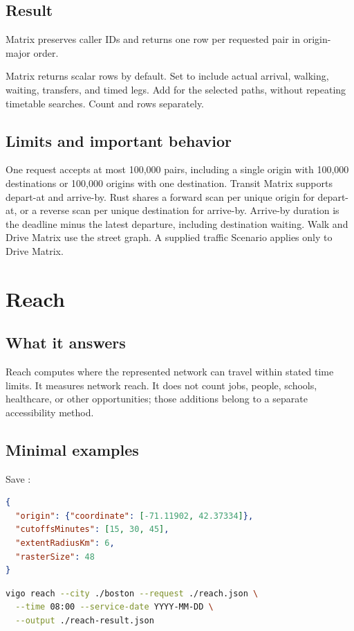 \documentclass[10pt,letterpaper]{article}
\begin{document}
\subsection{Result}

Matrix preserves caller IDs and returns one row per requested pair in origin-major order.

Matrix returns scalar rows by default. Set  to include actual arrival, walking, waiting, transfers, and timed legs. Add  for the selected paths, without repeating timetable searches. Count  and  rows separately.

\subsection{Limits and important behavior}

One request accepts at most 100,000 pairs, including a single origin with 100,000 destinations or 100,000 origins with one destination. Transit Matrix supports depart-at and arrive-by. Rust shares a forward scan per unique origin for depart-at, or a reverse scan per unique destination for arrive-by. Arrive-by duration is the deadline minus the latest departure, including destination waiting. Walk and Drive Matrix use the street graph. A supplied traffic Scenario applies only to Drive Matrix.

\section{Reach}

\subsection{What it answers}

Reach computes where the represented network can travel within stated time limits. It measures network reach. It does not count jobs, people, schools, healthcare, or other opportunities; those additions belong to a separate accessibility method.

\noindent\begin{minipage}{\linewidth}
\subsection{Minimal examples}

Save :

\begin{lstlisting}[language=json]
{
  "origin": {"coordinate": [-71.11902, 42.37334]},
  "cutoffsMinutes": [15, 30, 45],
  "extentRadiusKm": 6,
  "rasterSize": 48
}
\end{lstlisting}

\begin{lstlisting}[language=bash]
vigo reach --city ./boston --request ./reach.json \
  --time 08:00 --service-date YYYY-MM-DD \
  --output ./reach-result.json
\end{lstlisting}

\end{minipage}
\end{document}
